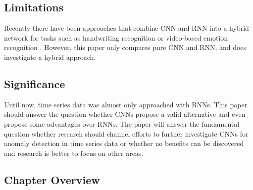 \subsection{Limitations}

Recently there have been approaches that combine CNN and RNN into a hybrid network for tasks such as handwriting recognition or video-based emotion recognition \parencite{Dutta2018} \parencite{Fan2016}. However, this paper only compares pure CNN and RNN, and does investigate a hybrid approach.


\subsection{Significance}

Until now, time series data was almost only approached with RNNs. This paper should answer the question whether CNNs propose a valid alternative and even propose some advantages over RNNs. The paper will answer the fundamental question whether research should channel efforts to further investigate CNNs for anomaly detection in time series data or whether no benefits can be discovered and research is better to focus on other areas. 

\subsection{Chapter Overview}



